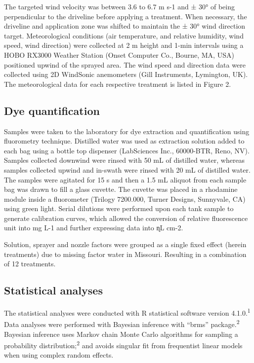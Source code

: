 \documentclass[
  12pt,
  a4paper,
]{article}
\begin{document}
The targeted wind velocity was between 3.6 to 6.7 m s-1 and ± 30° of
being perpendicular to the driveline before applying a treatment. When
necessary, the driveline and application zone was shifted to maintain
the ± 30° wind direction target. Meteorological conditions (air
temperature, and relative humidity, wind speed, wind direction) were
collected at 2 m height and 1-min intervals using a HOBO RX3000 Weather
Station (Onset Computer Co., Bourne, MA, USA) positioned upwind of the
sprayed area. The wind speed and direction data were collected using 2D
WindSonic anemometers (Gill Instruments, Lymington, UK). The
meteorological data for each respective treatment is listed in Figure 2.

\hypertarget{dye-quantification}{%
\subsection{Dye quantification}\label{dye-quantification}}

Samples were taken to the laboratory for dye extraction and
quantification using fluorometry technique. Distilled water was used as
extraction solution added to each bag using a bottle top dispenser
(LabSciences Inc., 60000-BTR, Reno, NV). Samples collected downwind were
rinsed with 50 mL of distilled water, whereas samples collected upwind
and in-swath were rinsed with 20 mL of distilled water. The samples were
agitated for 15 s and then a 1.5 mL aliquot from each sample bag was
drawn to fill a glass cuvette. The cuvette was placed in a rhodamine
module inside a fluorometer (Trilogy 7200.000, Turner Designs,
Sunnyvale, CA) using green light. Serial dilutions were performed upon
each tank sample to generate calibration curves, which allowed the
conversion of relative fluorescence unit into mg L-1 and further
expressing data into ɳL cm-2.

Solution, sprayer and nozzle factors were grouped as a single fixed
effect (herein treatments) due to missing factor water in Missouri.
Resulting in a combination of 12 treatments.

\hypertarget{statistical-analyses}{%
\subsection{Statistical analyses}\label{statistical-analyses}}

The statistical analyses were conducted with R statistical software
version 4.1.0.\textsuperscript{1} Data analyses were performed with
Bayesian inference with ``brms'' package.\textsuperscript{2} Bayesian
inference uses Markov chain Monte Carlo algorithms for sampling a
probability distribution;\textsuperscript{2} and avoids singular fit
from frequentist linear models when using complex random effects.
\end{document}

